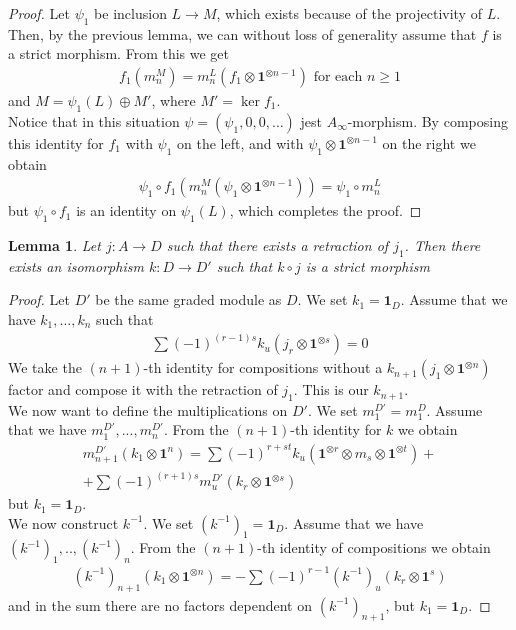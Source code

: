 \documentclass[a4paper, 12pt, openany, fleqn]{amsart}
\newtheorem{lemma}[theorem]{Lemma}
\begin{document}
\begin{proof}
    Let $\psi_1$ be inclusion $L\longrightarrow M$, which exists because of the projectivity of $L$. Then, by the previous lemma, we can without loss of generality assume that $f$ is a strict morphism. From this we get
    \begin{align*}
        f_1(m_n^M) = m_n^L(f_1\otimes\mathbf{1}^{\otimes n-1}) \text{ for each } n\geq 1
    \end{align*}
    and $M = \psi_1(L)\oplus M'$, where $M'=\ker{f_1}$.\\
    Notice that in this situation $\psi = (\psi_1, 0, 0,\dots)$ jest $A_\infty$-morphism. By composing this identity for $f_1$ with $\psi_1$ on the left, and with $\psi_1\otimes\mathbf{1}^{\otimes n-1}$ on the right we obtain
    \begin{align*}
        \psi_1\circ f_1(m_n^M(\psi_1\otimes\mathbf{1}^{\otimes n-1})) = \psi_1\circ m_n^L
    \end{align*}
    but $\psi_1 \circ f_1$ is an identity on $\psi_1(L)$, which completes the proof.
\end{proof}
\begin{lemma}
    Let $j:A\longrightarrow D$ such that there exists a retraction of $j_1$. Then there exists an isomorphism $k:D\longrightarrow D'$ such that $k\circ j$ is a strict morphism
\end{lemma}
\begin{proof} Let $D'$ be the same graded module as $D$. We set $k_1=\mathbf{1}_D$. Assume that we have $k_1,...,k_n$ such that
\begin{align*}
    \sum (-1)^{(r-1)s}k_u(j_r\otimes \mathbf{1}^{\otimes s}) = 0
\end{align*}
We take the $(n+1)$-th identity for compositions without a $k_{n+1}(j_1\otimes \mathbf{1}^{\otimes n})$ factor and compose it with the retraction of $j_1$. This is our $k_{n+1}$.\\
We now want to define the multiplications on $D'$. We set $m_1^{D'} = m_1^{D}$. Assume that we have $m_1^{D'},...,m_n^{D'}$. From the $(n+1)$-th identity for $k$ we obtain
\begin{align*}
    m_{n+1}^{D'}(k_1 \otimes \mathbf{1}^n) = \sum (-1)^{r+st}k_u(\mathbf{1}^{\otimes r}\otimes m_s \otimes \mathbf{1}^{\otimes t}) +\\ + \sum (-1)^{(r+1)s}m_u^{D'}(k_r\otimes\mathbf{1}^{\otimes s})
\end{align*}
but $k_1 = \mathbf{1}_D$.\\
We now construct $k^{-1}$. We set $(k^{-1})_1 = \mathbf{1}_D$. Assume that we have $(k^{-1})_1,..,(k^{-1})_n$. From the $(n+1)$-th identity of compositions we obtain
\begin{align*}
    (k^{-1})_{n+1}(k_1\otimes\mathbf{1}^{\otimes n}) = -\sum(-1)^{r-1}(k^{-1})_u(k_r\otimes \mathbf{1}^{s})
\end{align*}
and in the sum there are no factors dependent on $(k^{-1})_{n+1}$, but $k_1 = \mathbf{1}_D$.
\end{proof}
\end{document}
